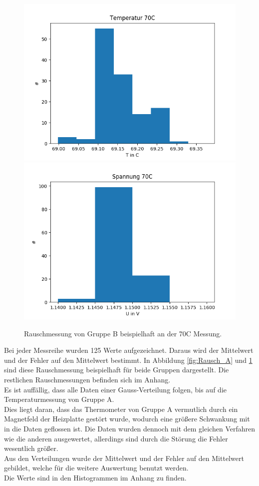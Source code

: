 \documentclass[12pt,a4paper]{article}
\begin{document}
\begin{figure}
\includegraphics[scale=0.55]{Bilder/Rauschmessung_B_Temp.png}
\includegraphics[scale=0.55]{Bilder/Rauschmessung_B_Spannung.png}
\caption{Rauschmessung von Gruppe B beispielhaft an der 70C Messung.}
\label{fig:Rausch_B}
\end{figure}

Bei jeder Messreihe wurden 125 Werte aufgezeichnet. Daraus wird der Mittelwert und der Fehler auf den Mittelwert bestimmt. In Abbildung \ref{fig:Rausch_A} und \ref{fig:Rausch_B} sind diese Rauschmessung beispielhaft für beide Gruppen dargestellt. Die restlichen Rauschmessungen befinden sich im Anhang.\\
Es ist auffällig, dass alle Daten einer Gauss-Verteilung folgen, bis auf die Temperaturmessung von Gruppe A.\\
Dies liegt daran, dass das Thermometer von Gruppe A vermutlich durch ein Magnetfeld der Heizplatte gestört wurde, wodurch eine größere Schwankung mit in die Daten geflossen ist. Die Daten wurden dennoch mit dem gleichen Verfahren wie die anderen ausgewertet, allerdings sind durch die Störung die Fehler wesentlich größer.\\
Aus den Verteilungen wurde der Mittelwert und der Fehler auf den Mittelwert gebildet, welche für die weitere Auswertung benutzt werden.\\
Die Werte sind in den Histogrammen im Anhang zu finden.\\
\end{document}
